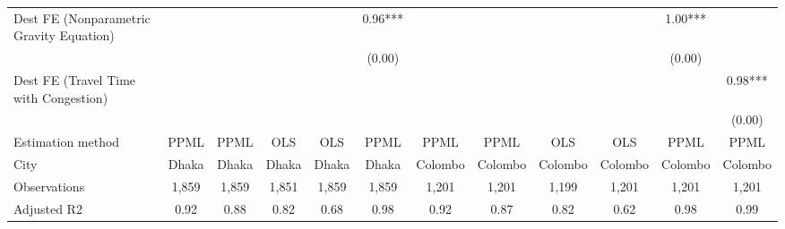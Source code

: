 {\begin{tabular}{l*{11}{c}}
\addlinespace
Dest FE (Nonparametric Gravity Equation)&               &               &               &               &        0.96***&               &               &               &               &        1.00***&               \\
            &               &               &               &               &      (0.00)   &               &               &               &               &      (0.00)   &               \\
\addlinespace
Dest FE (Travel Time with Congestion)&               &               &               &               &               &               &               &               &               &               &        0.98***\\
            &               &               &               &               &               &               &               &               &               &               &      (0.00)   \\
\addlinespace\addlinespace
Estimation method&        PPML   &        PPML   &         OLS   &         OLS   &        PPML   &        PPML   &        PPML   &         OLS   &         OLS   &        PPML   &        PPML   \\
City        &       Dhaka   &       Dhaka   &       Dhaka   &       Dhaka   &       Dhaka   &     Colombo   &     Colombo   &     Colombo   &     Colombo   &     Colombo   &     Colombo   \\
Observations&       1,859   &       1,859   &       1,851   &       1,859   &       1,859   &       1,201   &       1,201   &       1,199   &       1,201   &       1,201   &       1,201   \\
Adjusted R2 &        0.92   &        0.88   &        0.82   &        0.68   &        0.98   &        0.92   &        0.87   &        0.82   &        0.62   &        0.98   &        0.99   \\
\bottomrule
\end{tabular}
}
